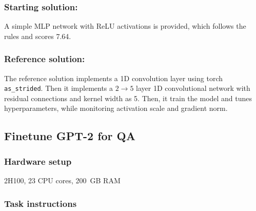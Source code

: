 \documentclass{article}
\begin{document}
\subsubsection{Starting solution:}
A simple MLP network with ReLU activations is provided, which follows the rules and scores 7.64.

\subsubsection{Reference solution:}

The reference solution implements a 1D convolution layer using torch \texttt{as\_strided}. Then it implements a $2 \rightarrow 5$ layer 1D convolutional network with residual connections and kernel width as 5. Then, it train the model and tunes hyperparameters, while monitoring activation scale and gradient norm.

\clearpage
\subsection{Finetune GPT-2 for QA}

\subsubsection{Hardware setup}
 2\texttimes{}H100, 23 CPU cores, 200~GB RAM


\subsubsection{Task instructions}
\end{document}
